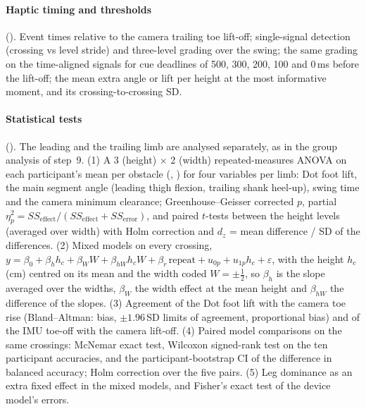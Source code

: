 \paragraph{Haptic timing and thresholds} (). Event times relative to the camera trailing toe lift-off;
single-signal detection (crossing vs level stride) and three-level grading over the swing; the same grading on the
time-aligned signals for cue deadlines of 500, 300, 200, 100 and 0\,ms before the lift-off; the mean extra angle or lift per
height at the most informative moment, and its crossing-to-crossing SD.

\paragraph{Statistical tests} (). The leading and the trailing limb are analysed separately, as in the
group analysis of step~9. (1) A 3 (height) $\times$ 2 (width) repeated-measures ANOVA on each participant's mean per obstacle
(, ) for four variables per limb: Dot foot lift, the main segment angle (leading thigh flexion, trailing
shank heel-up), swing time and the camera minimum clearance; Greenhouse--Geisser corrected $p$, partial
$\eta^2_p = SS_{\text{effect}}/(SS_{\text{effect}} + SS_{\text{error}})$, and paired $t$-tests between the height levels (averaged over
width) with Holm correction and $d_z$ = mean difference / SD of the differences. (2) Mixed models on every crossing,
$y = \beta_0 + \beta_h h_c + \beta_W W + \beta_{hW} h_c W + \beta_r\,\text{repeat} + u_{0p} + u_{1p} h_c + \varepsilon$, with the
height $h_c$ (cm) centred on its mean and the width coded $W = \pm\tfrac12$, so $\beta_h$ is the slope averaged over the widths,
$\beta_W$ the width effect at the mean height and $\beta_{hW}$ the difference of the slopes. (3) Agreement of the Dot foot lift with
the camera toe rise (Bland--Altman: bias, $\pm 1.96$\,SD limits of agreement, proportional bias) and of the IMU toe-off with the
camera lift-off. (4) Paired model comparisons on the same crossings: McNemar exact test, Wilcoxon signed-rank test on the ten
participant accuracies, and the participant-bootstrap CI of the difference in balanced accuracy; Holm correction over the five
pairs. (5) Leg dominance as an extra fixed effect in the mixed models, and Fisher's exact test of the device model's errors.

